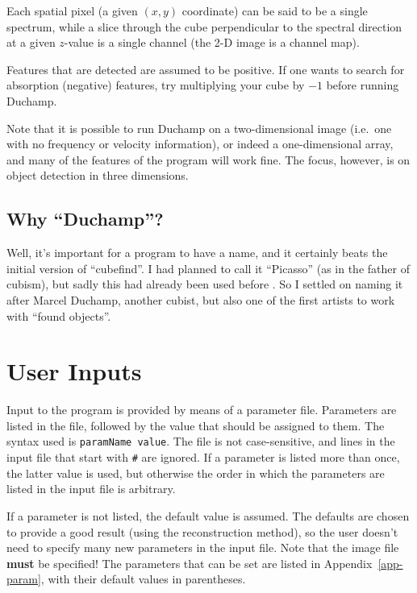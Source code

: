 \documentclass[12pt,a4paper]{article}
\newcommand{\ie}{i.e.\ }
\begin{document}
Each spatial pixel (a given $(x,y)$ coordinate) can be said to be a
single spectrum, while a slice through the cube perpendicular to the
spectral direction at a given $z$-value is a single channel (the 2-D
image is a channel map).

Features that are detected are assumed to be positive. If one wants to
search for absorption (negative) features, try multiplying your cube
by $-1$ before running Duchamp.

Note that it is possible to run Duchamp on a two-dimensional image
(\ie one with no frequency or velocity information), or indeed a
one-dimensional array, and many of the features of the program will
work fine. The focus, however, is on object detection in three
dimensions.

\subsection{Why ``Duchamp''?}

Well, it's important for a program to have a name, and it certainly
beats the initial version of ``cubefind''. I had planned to call it
``Picasso'' (as in the father of cubism), but sadly this had already
been used before \citep{minchin99}. So I settled on naming it after
Marcel Duchamp, another cubist, but also one of the first artists to
work with ``found objects''.

\section{User Inputs}
\label{sec-param}

Input to the program is provided by means of a parameter file. Parameters
are listed in the file, followed by the value that should be assigned
to them. The syntax used is {\tt paramName value}. The file is not
case-sensitive, and lines in the input file that start with {\tt \#} are
ignored. If a parameter is listed more than once, the latter value is
used, but otherwise the order in which the parameters are listed in the
input file is arbitrary. 

If a parameter is not listed, the default value is assumed. The
defaults are chosen to provide a good result (using the reconstruction
method), so the user doesn't need to specify many new parameters in
the input file. Note that the image file {\bf must} be specified! The
parameters that can be set are listed in Appendix~\ref{app-param},
with their default values in parentheses.
\end{document}
